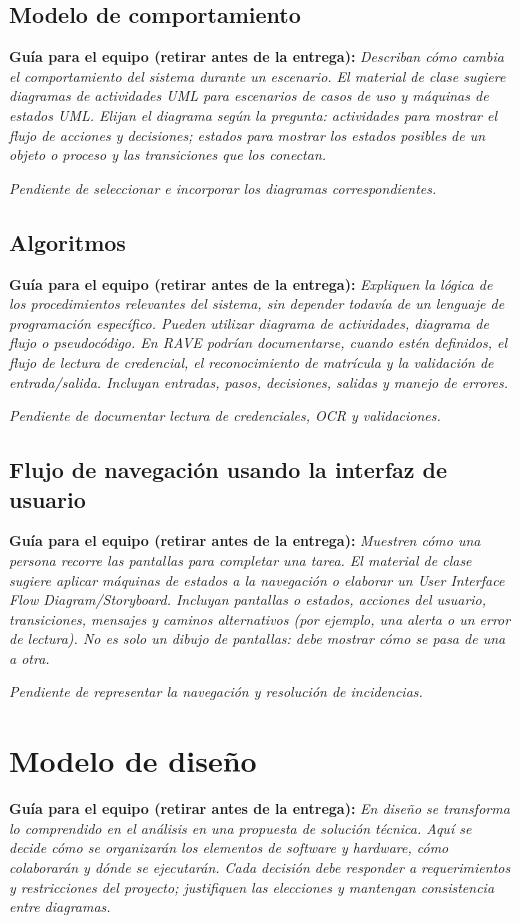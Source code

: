 \documentclass[12pt,letterpaper]{article}
\newcommand{\guia}[1]{\par\smallskip\noindent\textbf{Guía para el equipo (retirar antes de la entrega):} \textit{#1}\par\smallskip}
\begin{document}
\subsection{Modelo de comportamiento}
\guia{Describan cómo cambia el comportamiento del sistema durante un escenario. El material de clase sugiere diagramas de actividades UML para escenarios de casos de uso y máquinas de estados UML. Elijan el diagrama según la pregunta: actividades para mostrar el flujo de acciones y decisiones; estados para mostrar los estados posibles de un objeto o proceso y las transiciones que los conectan.}
\textit{Pendiente de seleccionar e incorporar los diagramas correspondientes.}
\subsection{Algoritmos}
\guia{Expliquen la lógica de los procedimientos relevantes del sistema, sin depender todavía de un lenguaje de programación específico. Pueden utilizar diagrama de actividades, diagrama de flujo o pseudocódigo. En RAVE podrían documentarse, cuando estén definidos, el flujo de lectura de credencial, el reconocimiento de matrícula y la validación de entrada/salida. Incluyan entradas, pasos, decisiones, salidas y manejo de errores.}
\textit{Pendiente de documentar lectura de credenciales, OCR y validaciones.}
\subsection{Flujo de navegación usando la interfaz de usuario}
\guia{Muestren cómo una persona recorre las pantallas para completar una tarea. El material de clase sugiere aplicar máquinas de estados a la navegación o elaborar un User Interface Flow Diagram/Storyboard. Incluyan pantallas o estados, acciones del usuario, transiciones, mensajes y caminos alternativos (por ejemplo, una alerta o un error de lectura). No es solo un dibujo de pantallas: debe mostrar cómo se pasa de una a otra.}
\textit{Pendiente de representar la navegación y resolución de incidencias.}
\section{Modelo de diseño}
\guia{En diseño se transforma lo comprendido en el análisis en una propuesta de solución técnica. Aquí se decide cómo se organizarán los elementos de software y hardware, cómo colaborarán y dónde se ejecutarán. Cada decisión debe responder a requerimientos y restricciones del proyecto; justifiquen las elecciones y mantengan consistencia entre diagramas.}
\end{document}
